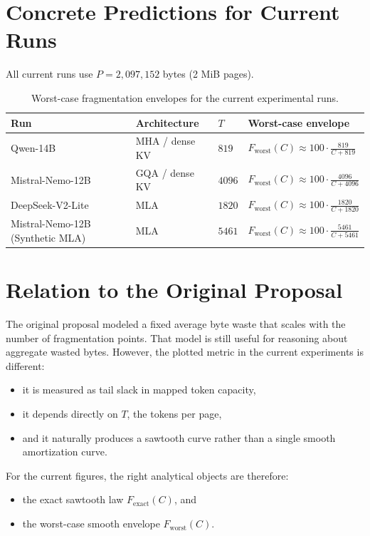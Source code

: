 \documentclass[11pt]{article}
\begin{document}
\section{Concrete Predictions for Current Runs}

All current runs use $P = 2{,}097{,}152$ bytes (2 MiB pages).

\begin{table}[h]
\centering
\begin{tabular}{@{}llll@{}}
\toprule
Run & Architecture & $T$ & Worst-case envelope \\ \midrule
Qwen-14B & MHA / dense KV & $819$ &
$F_{\text{worst}}(C) \approx 100 \cdot \frac{819}{C + 819}$ \\[4pt]
Mistral-Nemo-12B & GQA / dense KV & $4096$ &
$F_{\text{worst}}(C) \approx 100 \cdot \frac{4096}{C + 4096}$ \\[4pt]
DeepSeek-V2-Lite & MLA & $1820$ &
$F_{\text{worst}}(C) \approx 100 \cdot \frac{1820}{C + 1820}$ \\[4pt]
Mistral-Nemo-12B (Synthetic MLA) & MLA & $5461$ &
$F_{\text{worst}}(C) \approx 100 \cdot \frac{5461}{C + 5461}$ \\ \bottomrule
\end{tabular}
\caption{Worst-case fragmentation envelopes for the current experimental runs.}
\end{table}

\section{Relation to the Original Proposal}

The original proposal modeled a fixed average byte waste that scales with the number of fragmentation points.
That model is still useful for reasoning about aggregate wasted bytes.
However, the plotted metric in the current experiments is different:
\begin{itemize}
    \item it is measured as tail slack in mapped token capacity,
    \item it depends directly on $T$, the tokens per page,
    \item and it naturally produces a sawtooth curve rather than a single smooth amortization curve.
\end{itemize}

For the current figures, the right analytical objects are therefore:
\begin{itemize}
    \item the exact sawtooth law $F_{\text{exact}}(C)$, and
    \item the worst-case smooth envelope $F_{\text{worst}}(C)$.
\end{itemize}
\end{document}
